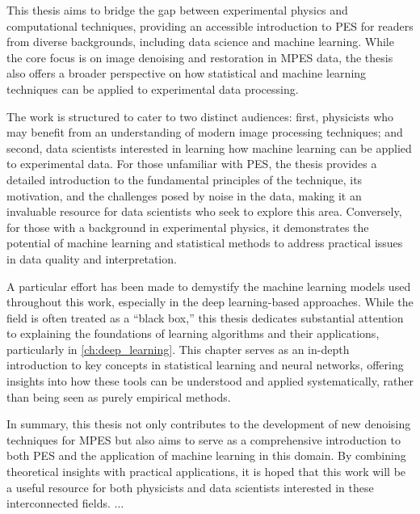 This thesis aims to bridge the gap between experimental physics and computational techniques, providing an accessible introduction to \gls{PES} for readers from diverse backgrounds, including data science and machine learning. While the core focus is on image denoising and restoration in \gls{MPES} data, the thesis also offers a broader perspective on how statistical and machine learning techniques can be applied to experimental data processing.

The work is structured to cater to two distinct audiences: first, physicists who may benefit from an understanding of modern image processing techniques; and second, data scientists interested in learning how machine learning can be applied to experimental data. For those unfamiliar with PES, the thesis provides a detailed introduction to the fundamental principles of the technique, its motivation, and the challenges posed by noise in the data, making it an invaluable resource for data scientists who seek to explore this area. Conversely, for those with a background in experimental physics, it demonstrates the potential of machine learning and statistical methods to address practical issues in data quality and interpretation.

A particular effort has been made to demystify the machine learning models used throughout this work, especially in the deep learning-based approaches. While the field is often treated as a “black box,” this thesis dedicates substantial attention to explaining the foundations of learning algorithms and their applications, particularly in \cref{ch:deep_learning}. This chapter serves as an in-depth introduction to key concepts in statistical learning and neural networks, offering insights into how these tools can be understood and applied systematically, rather than being seen as purely empirical methods.

In summary, this thesis not only contributes to the development of new denoising techniques for \gls{MPES} but also aims to serve as a comprehensive introduction to both \gls{PES} and the application of machine learning in this domain. By combining theoretical insights with practical applications, it is hoped that this work will be a useful resource for both physicists and data scientists interested in these interconnected fields.
$\dots$